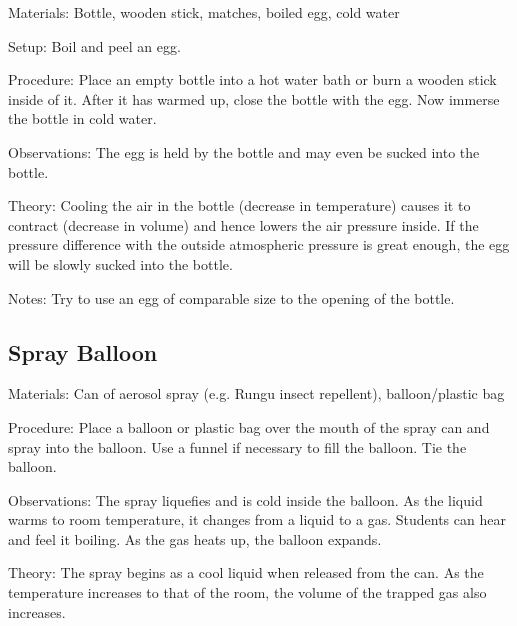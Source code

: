 \begin{multicols}{2}
\begin{description*}
\item[Materials:]{Bottle, wooden stick, matches, boiled egg, cold water}
\item[Setup:]{Boil and peel an egg.}
\item[Procedure:]{Place an empty bottle into a hot water bath or burn a wooden stick inside of it. After it has warmed up, close the bottle with the egg. Now immerse the bottle in cold water.}
\item[Observations:]{The egg is held by the bottle and may even be sucked into the bottle.}
\item[Theory:]{Cooling the air in the bottle (decrease in temperature) causes it to contract (decrease in volume) and hence lowers the air pressure inside. If the pressure difference with the outside atmospheric pressure is great enough, the egg will be slowly sucked into the bottle.}
\item[Notes:]{Try to use an egg of comparable size to the opening of the bottle.}
\end{description*}

\subsection{Spray Balloon}


\begin{description*}
\item[Materials:]{Can of aerosol spray (e.g. Rungu insect repellent), balloon/plastic bag}
\item[Procedure:]{Place a balloon or plastic bag over the mouth of the spray can and spray into the balloon. Use a funnel if necessary to fill the balloon. Tie the balloon.}
\item[Observations:]{The spray liquefies and is cold inside the balloon. As the liquid warms to room temperature, it changes from a liquid to a gas. Students can hear and feel it boiling. As the gas heats up, the balloon expands.}
\item[Theory:]{The spray begins as a cool liquid when released from the can. As the temperature increases to that of the room, the volume of the trapped gas also increases.}
\end{description*}


\end{multicols}
